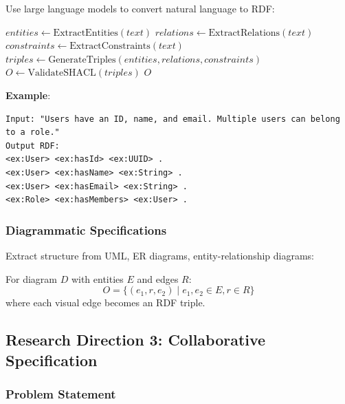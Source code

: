 Use large language models to convert natural language to RDF:

\begin{algorithm}
\caption{NL-to-RDF Translation}
\begin{algorithmic}[1]
    \State $entities \gets \text{ExtractEntities}(text)$ 
    \State $relations \gets \text{ExtractRelations}(text)$ 
    \State $constraints \gets \text{ExtractConstraints}(text)$ 
    \State $triples \gets \text{GenerateTriples}(entities, relations, constraints)$
    \State $O \gets \text{ValidateSHACL}(triples)$ 
    \State \Return $O$
\EndProcedure
\end{algorithmic}
\end{algorithm}

\textbf{Example}:

\begin{verbatim}
Input: "Users have an ID, name, and email. Multiple users can belong to a role."
Output RDF:
<ex:User> <ex:hasId> <ex:UUID> .
<ex:User> <ex:hasName> <ex:String> .
<ex:User> <ex:hasEmail> <ex:String> .
<ex:Role> <ex:hasMembers> <ex:User> .
\end{verbatim}

\subsubsection{Diagrammatic Specifications}

Extract structure from UML, ER diagrams, entity-relationship diagrams:

\begin{definition}
    For diagram $D$ with entities $E$ and edges $R$:
    \begin{equation}
        O = \{(e_1, r, e_2) \mid e_1, e_2 \in E, r \in R\}
    \end{equation}
    where each visual edge becomes an RDF triple.
\end{definition}

\subsection{Research Direction 3: Collaborative Specification}

\subsubsection{Problem Statement}

